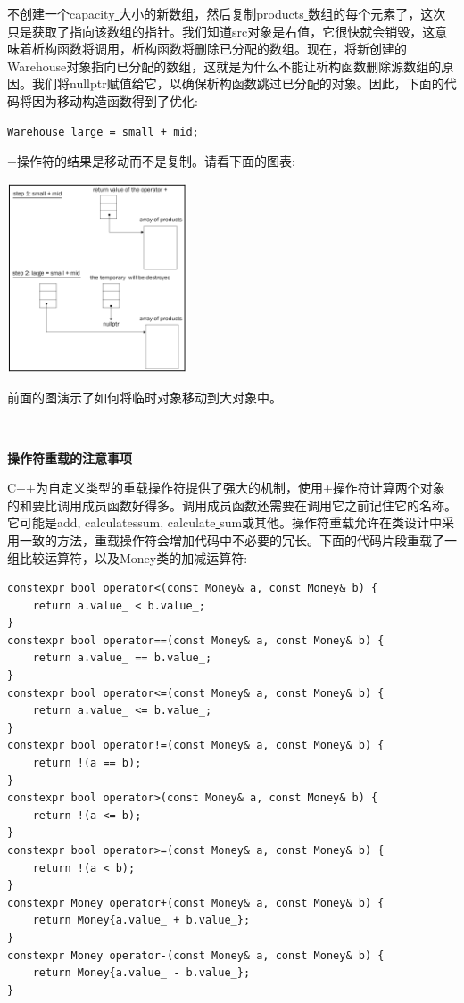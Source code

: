 不创建一个capacity\underline{ }大小的新数组，然后复制products\underline{ }数组的每个元素了，这次只是获取了指向该数组的指针。我们知道src对象是右值，它很快就会销毁，这意味着析构函数将调用，析构函数将删除已分配的数组。现在，将新创建的Warehouse对象指向已分配的数组，这就是为什么不能让析构函数删除源数组的原因。我们将nullptr赋值给它，以确保析构函数跳过已分配的对象。因此，下面的代码将因为移动构造函数得到了优化: \par

\begin{lstlisting}[caption={}]
Warehouse large = small + mid;
\end{lstlisting}

+操作符的结果是移动而不是复制。请看下面的图表:\par

\begin{center}
	\includegraphics[width=0.4\textwidth]{content/Section-1/Chapter-3/10}
\end{center}

前面的图演示了如何将临时对象移动到大对象中。 \par

\noindent\textbf{}\ \par
\textbf{操作符重载的注意事项} \ \par
C++为自定义类型的重载操作符提供了强大的机制，使用+操作符计算两个对象的和要比调用成员函数好得多。调用成员函数还需要在调用它之前记住它的名称。它可能是add, calculatessum, calculate\underline{ }sum或其他。操作符重载允许在类设计中采用一致的方法，重载操作符会增加代码中不必要的冗长。下面的代码片段重载了一组比较运算符，以及Money类的加减运算符:\par

\begin{lstlisting}[caption={}]
constexpr bool operator<(const Money& a, const Money& b) {
	return a.value_ < b.value_;
}
constexpr bool operator==(const Money& a, const Money& b) {
	return a.value_ == b.value_;
}
constexpr bool operator<=(const Money& a, const Money& b) {
	return a.value_ <= b.value_;
}
constexpr bool operator!=(const Money& a, const Money& b) {
	return !(a == b);
}
constexpr bool operator>(const Money& a, const Money& b) {
	return !(a <= b);
}
constexpr bool operator>=(const Money& a, const Money& b) {
	return !(a < b);
}
constexpr Money operator+(const Money& a, const Money& b) {
	return Money{a.value_ + b.value_};
}
constexpr Money operator-(const Money& a, const Money& b) {
	return Money{a.value_ - b.value_};
}
\end{lstlisting}

